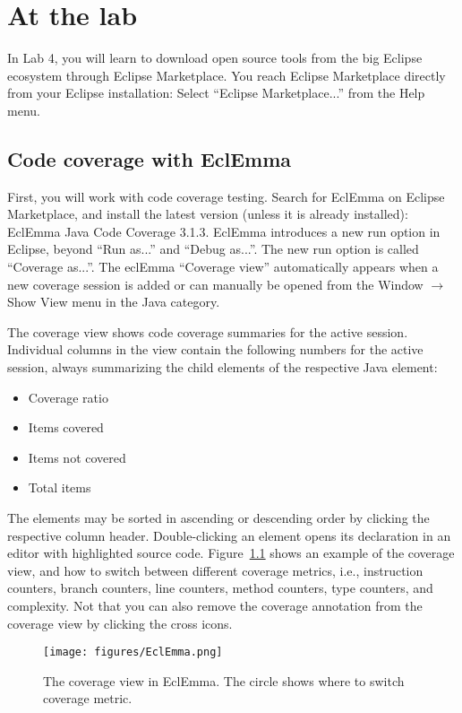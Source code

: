 \documentclass{scrreprt}
\begin{document}
\chapter{At the lab} \label{sec:atlab}
In Lab 4, you will learn to download open source tools from the big Eclipse ecosystem through Eclipse Marketplace. You reach Eclipse Marketplace directly from your Eclipse installation: Select ``Eclipse Marketplace...'' from the Help menu.

\section{Code coverage with EclEmma}
First, you will work with code coverage testing. Search for EclEmma on Eclipse Marketplace, and install the latest version (unless it is already installed): EclEmma Java Code Coverage 3.1.3. EclEmma introduces a new run option in Eclipse, beyond ``Run as...'' and ``Debug as...''. The new run option is called ``Coverage as...''. The eclEmma ``Coverage view'' automatically appears when a new coverage session is added or can manually be opened from the Window $\rightarrow$ Show View menu in the Java category. 

The coverage view shows code coverage summaries for the active session. Individual columns in the view contain the following numbers for the active session, always summarizing the child elements of the respective Java element:

\begin{itemize}
\item Coverage ratio
\item Items covered
\item Items not covered
\item Total items
\end{itemize}

The elements may be sorted in ascending or descending order by clicking the respective column header. Double-clicking an element opens its declaration in an editor with highlighted source code. Figure~\ref{fig:eclemma} shows an example of the coverage view, and how to switch between different coverage metrics, i.e., instruction counters, branch counters, line counters, method counters, type counters, and complexity. Not that you can also remove the coverage annotation from the coverage view by clicking the cross icons.

\begin{figure}
\centering
\texttt{[image: figures/EclEmma.png]}
\caption{The coverage view in EclEmma. The circle shows where to switch coverage metric.}
\label{fig:eclemma}
\end{figure}
\end{document}
